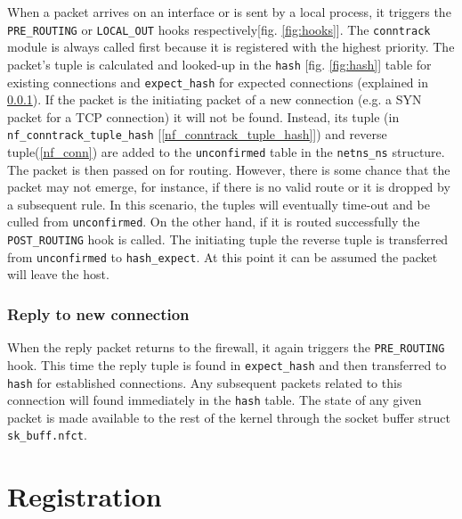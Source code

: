 \documentclass[a4paper,10pt]{article}
\newcommand{\figref}[1]{[fig. \ref{#1}]}
\newcommand{\cref}[1]{[\ref{#1}]}
\begin{document}
When a packet arrives on an interface or is sent by a local process,
it triggers the \verb|PRE_ROUTING| or \verb|LOCAL_OUT| hooks
respectively\figref{fig:hooks}. The \verb|conntrack| module is always called first
because it is registered with the highest priority. The packet's tuple
is calculated and looked-up in the \verb|hash| \figref{fig:hash} table
for existing connections and \verb|expect_hash| for expected
connections (explained in \ref{reply}). If the packet is the
initiating packet of a new connection (e.g. a SYN packet for a TCP
connection) it will not be found. Instead, its tuple (in
\verb|nf_conntrack_tuple_hash| \cref{nf_conntrack_tuple_hash}) and reverse tuple(\ref{nf_conn}) are
added to the \verb|unconfirmed| table in the \verb|netns_ns|
structure. The packet is then passed on for routing. However, there is
some chance that the packet may not emerge, for instance, if there is no valid
route or it is dropped by a subsequent
rule\cite{netfilter-internals}. In this scenario, the tuples will
eventually time-out and be culled from \verb|unconfirmed|. On the
other hand, if it is routed successfully the \verb|POST_ROUTING| hook
is called. The initiating tuple the reverse tuple is transferred from \verb|unconfirmed| to
\verb|hash_expect|. At this point it can be assumed the packet will
leave the host.

\subsubsection{Reply to new connection}\label{reply}
When the reply packet returns to the firewall, it again triggers the
\verb|PRE_ROUTING| hook. This time the reply tuple is found in
\verb|expect_hash| and then transferred to \verb|hash| for established
connections. Any subsequent packets related to this connection will
found immediately in the \verb|hash| table. The state of any given
packet is made available to the rest of the kernel through the socket buffer struct
\verb|sk_buff.nfct|.

\section{Registration}

%


\end{document}
